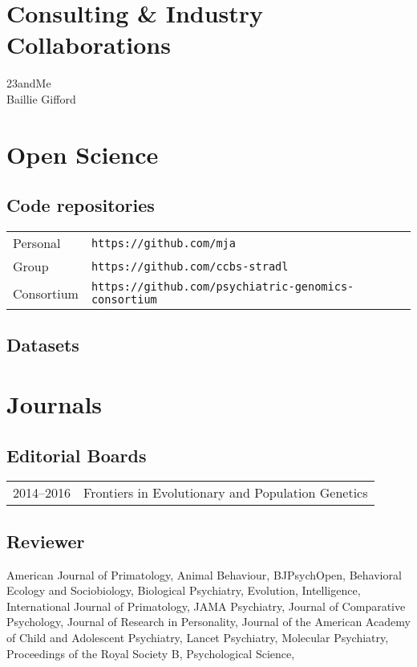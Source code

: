 \documentclass[11pt]{article}
\begin{document}
\section*{Consulting \& Industry Collaborations}

23andMe \\
Baillie Gifford

\section*{Open Science}

\subsection*{Code repositories}

\begin{tabular}{p{3cm}p{12cm}}

Personal &  \texttt{https://github.com/mja} \\
Group &  \texttt{https://github.com/ccbs-stradl} \\
Consortium & \texttt{https://github.com/psychiatric-genomics-consortium}

\end{tabular}

\subsection*{Datasets}

\printbibliography[type=misc,heading=none]

\section*{Journals}

\subsection*{Editorial Boards}

\begin{tabular}{p{3cm}p{12cm}}

2014--2016 & Frontiers in Evolutionary and Population Genetics 

\end{tabular}

\subsection*{Reviewer}

American Journal of Primatology, 
Animal Behaviour,
BJPsychOpen, 
Behavioral Ecology and Sociobiology, 
Biological Psychiatry, 
Evolution, 
Intelligence, 
International Journal of Primatology, 
JAMA Psychiatry, 
Journal of Comparative Psychology, 
Journal of Research in Personality, 
Journal of the American Academy of Child and Adolescent Psychiatry, 
Lancet Psychiatry, 
Molecular Psychiatry, 
Proceedings of the Royal Society B, 
Psychological Science, 
\end{document}

